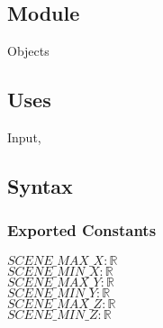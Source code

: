 \documentclass[12pt, titlepage]{article}
\begin{document}
\subsection{Module}
Objects

\subsection{Uses}
Input,  
 
\subsection{Syntax}
\subsubsection{Exported Constants}
$SCENE\_MAX\_X : \mathbb{R}$\\
$SCENE\_MIN\_X : \mathbb{R}$\\
$SCENE\_MAX\_Y : \mathbb{R}$\\
$SCENE\_MIN\_Y : \mathbb{R}$\\
$SCENE\_MAX\_Z : \mathbb{R}$\\
$SCENE\_MIN\_Z : \mathbb{R}$\\
\end{document}
